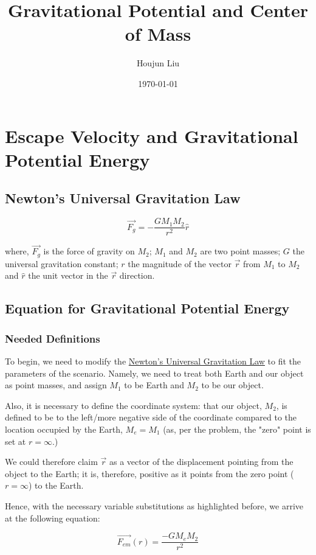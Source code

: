 \documentclass[letterpaper]{article}
\author{Houjun Liu}
\date{\today}
\title{Gravitational Potential and Center of Mass}
\renewcommand{\tableofcontents}{}
\begin{document}
\tableofcontents


\section{Escape Velocity and Gravitational Potential Energy}
\label{sec:orgeee230d}

\subsection{Newton's Universal Gravitation Law}
\label{sec:orgbe1d026}
\begin{equation}
\vec{F_g} = - \frac{GM_1M_2}{r^2} \hat{r}
\end{equation}

where, \(\vec{F_g}\) is the force of gravity on \(M_2\); \(M_1\) and \(M_2\) are two point masses; \(G\) the universal gravitation constant; \(r\) the magnitude of the vector \(\vec{r}\) from \(M_1\) to \(M_2\) and \(\hat{r}\) the unit vector in the \(\vec{r}\) direction.

\subsection{Equation for Gravitational Potential Energy}
\label{sec:orgc30336f}

\subsubsection{Needed Definitions}
\label{sec:orgff643ee}
To begin, we need to modify the \hyperref[sec:orgbe1d026]{Newton's Universal Gravitation Law} to fit the parameters of the scenario. Namely, we need to treat both Earth and our object as point masses, and assign \(M_1\) to be Earth and \(M_2\) to be our object.

Also, it is necessary to define the coordinate system: that our object, \(M_2\), is defined to be to the left/more negative side of the coordinate compared to the location occupied by the Earth, \(M_e=M_1\) (as, per the problem, the "zero" point is set at \(r = \infty\).)

We could therefore claim \(\vec{r}\) as a vector of the displacement pointing from the object to the Earth; it is, therefore, positive as it points from the zero point (\(r=\infty\)) to the Earth.

Hence, with the necessary variable substitutions as highlighted before, we arrive at the following equation:

\begin{equation}
\vec{F_{em}}(r) = \frac{-GM_eM_2}{r^2}
\end{equation}
\end{document}
